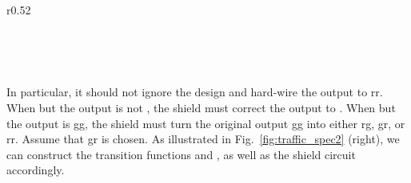 \documentclass{llncs}
\begin{document}
\begin{wrapfigure}[9]{r}{0.52\textwidth}
\begin{minipage}{.27\textwidth}
\centering
{\scriptsize \tt
\\
\\
}
\verb' '\\
\end{minipage}
\caption{Enforcing Properties 1 and 2.}
\label{fig:traffic_spec2}
\end{wrapfigure} 
In particular, it should not ignore the design and hard-wire 
the output to \textsf{rr}.  When  but the output is not 
, the shield must correct the output to .  
When  but the output is \textsf{gg}, the shield must turn 
the original output \textsf{gg} into either \textsf{rg}, \textsf{gr}, or 
\textsf{rr}.  Assume that \textsf{gr} is chosen.  As illustrated in 
Fig.~\ref{fig:traffic_spec2} (right),  we can construct the transition 
functions  and , as 
well as the shield circuit accordingly.
\end{document}
